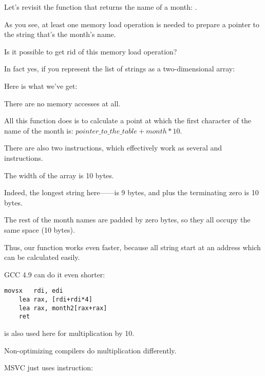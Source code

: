 
Let's revisit the function that returns the name of a month: .

As you see, at least one memory load operation is needed to prepare a pointer to the string
that's the month's name.

Is it possible to get rid of this memory load operation?

In fact yes, if you represent the list of strings as a two-dimensional array:



Here is what we've get:



There are no memory accesses at all.

All this function does is to calculate a point at which the first character of the name of the month is: 
$pointer\_to\_the\_table + month * 10$.

There are also two \LEA instructions, which effectively work as several \MUL and \MOV instructions.

The width of the array is 10 bytes. 

Indeed, the longest string here------is 9 bytes, and plus the terminating zero is 10 bytes.

The rest of the month names are padded by zero bytes, so they all occupy the same space (10 bytes).

Thus, our function works even faster, because all string start at an address which can be
calculated easily.

\Optimizing GCC 4.9 can do it even shorter:

\begin{lstlisting}[caption=\Optimizing GCC 4.9 x64]
	movsx	rdi, edi
	lea	rax, [rdi+rdi*4]
	lea	rax, month2[rax+rax]
	ret
\end{lstlisting}

\LEA is also used here for multiplication by 10.

Non-optimizing compilers do multiplication differently.



\NonOptimizing MSVC just uses \IMUL instruction:

